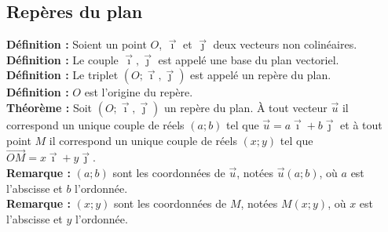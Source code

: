 \documentclass[a4paper,titlepage]{article}
\begin{document}
    \subsection{Repères du plan}
        \textbf{Définition :} Soient un point $O$, $\vec{\imath}$ et $\vec{\jmath}$ deux vecteurs non colinéaires.
        \\
        \textbf{Définition :} Le couple $\vec{\imath},\vec{\jmath}$ est appelé une base du plan vectoriel.
        \\
        \textbf{Définition :} Le triplet $\left(O;\vec{\imath},\vec{\jmath}\right)$ est appelé un repère du plan.
        \\
        \textbf{Définition :} $O$ est l’origine du repère.
        \\
        \textbf{Théorème :} Soit $\left(O;\vec{\imath},\vec{\jmath}\right)$ un repère du plan. À tout vecteur $\vec{u}$ il correspond un unique couple de réels $\left(a;b\right)$ tel que $\vec{u}=a\vec{\imath}+b\vec{\jmath}$ et à tout point $M$ il correspond un unique couple de réels $\left(x;y\right)$ tel que $\overrightarrow{OM}=x\vec{\imath}+y\vec{\jmath}$.
        \\
        \textbf{Remarque :} $\left(a;b\right)$ sont les coordonnées de $\vec{u}$, notées $\vec{u}\left(a;b\right)$, où $a$ est l’abscisse et $b$ l’ordonnée.
        \\
        \textbf{Remarque :} $\left(x;y\right)$ sont les coordonnées de $M$, notées $M\left(x;y\right)$, où $x$ est l’abscisse et $y$ l’ordonnée.
\end{document}
